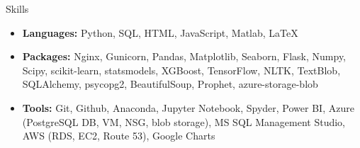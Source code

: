 \documentclass{resume} %
\begin{document}
	\begin{rSection}{Skills}
		\begin{itemize}[leftmargin=0em]
			\item {\bf Languages:}{ Python, SQL, HTML, JavaScript, Matlab, LaTeX}
			\item {\bf Packages:}{ Nginx, Gunicorn, Pandas, Matplotlib, Seaborn, Flask, Numpy, Scipy, scikit-learn, statsmodels, XGBoost, TensorFlow, NLTK, TextBlob, SQLAlchemy, psycopg2, BeautifulSoup, Prophet, azure-storage-blob}
			\item {\bf Tools:}{ Git, Github, Anaconda, Jupyter Notebook, Spyder, Power BI, Azure (PostgreSQL DB, VM, NSG, blob storage), MS SQL Management Studio, AWS (RDS, EC2, Route 53), Google Charts }
			
		\end{itemize}
	\end{rSection}
	
\end{document}
